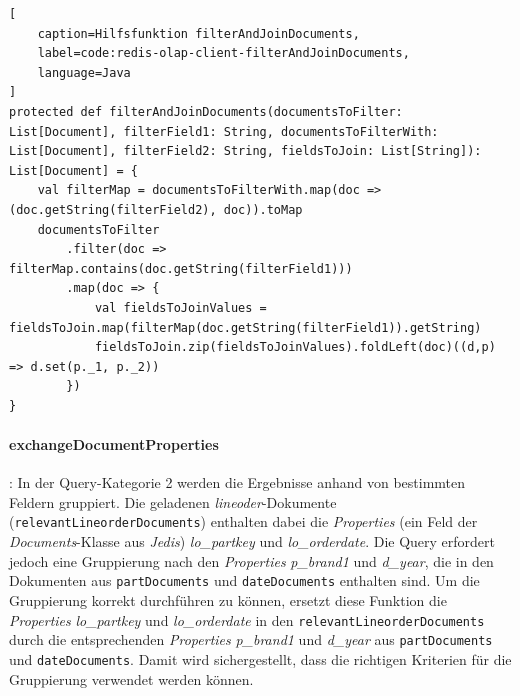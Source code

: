\begin{lstlisting}[
    caption=Hilfsfunktion filterAndJoinDocuments,
    label=code:redis-olap-client-filterAndJoinDocuments,
    language=Java
]
protected def filterAndJoinDocuments(documentsToFilter: List[Document], filterField1: String, documentsToFilterWith: List[Document], filterField2: String, fieldsToJoin: List[String]): List[Document] = {
	val filterMap = documentsToFilterWith.map(doc => (doc.getString(filterField2), doc)).toMap
	documentsToFilter
		.filter(doc => filterMap.contains(doc.getString(filterField1)))
		.map(doc => {
			val fieldsToJoinValues = fieldsToJoin.map(filterMap(doc.getString(filterField1)).getString)
			fieldsToJoin.zip(fieldsToJoinValues).foldLeft(doc)((d,p) => d.set(p._1, p._2))
		})
}
\end{lstlisting}

\paragraph{exchangeDocumentProperties}: In der Query-Kategorie 2 werden die Ergebnisse anhand von bestimmten Feldern gruppiert.
Die geladenen \emph{lineoder}-Dokumente (\lstinline|relevantLineorderDocuments|) enthalten dabei die \emph{Properties} (ein Feld der \emph{Documents}-Klasse aus \emph{Jedis}) \emph{lo\_partkey} und \emph{lo\_orderdate}. Die Query erfordert jedoch eine Gruppierung nach den \emph{Properties} \emph{p\_brand1} und \emph{d\_year}, die in den Dokumenten aus \lstinline|partDocuments| und \lstinline|dateDocuments| enthalten sind. Um die Gruppierung korrekt durchführen zu können, ersetzt diese Funktion die \emph{Properties} \emph{lo\_partkey} und \emph{lo\_orderdate} in den \lstinline|relevantLineorderDocuments| durch die entsprechenden \emph{Properties} \emph{p\_brand1} und \emph{d\_year} aus \lstinline|partDocuments| und \lstinline|dateDocuments|. Damit wird sichergestellt, dass die richtigen Kriterien für die Gruppierung verwendet werden können.

